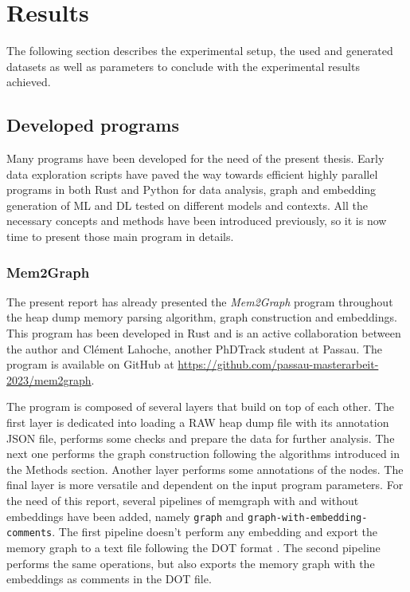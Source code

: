 \chapter{Results}\label{chap:results}

The following section describes the experimental setup, the used and generated datasets as well as parameters to conclude with the experimental results achieved.

\section{Developed programs}
Many programs have been developed for the need of the present thesis. Early data exploration scripts have paved the way towards efficient highly parallel programs in both Rust and Python for data analysis, graph and embedding generation of ML and DL tested on different models and contexts. All the necessary concepts and methods have been introduced previously, so it is now time to present those main program in details.

\subsection{Mem2Graph}
The present report has already presented the \textit{Mem2Graph} program throughout the heap dump memory parsing algorithm, graph construction and embeddings. This program has been developed in Rust and is an active collaboration between the author and Clément Lahoche, another PhDTrack student at Passau. The program is available on GitHub at \url{https://github.com/passau-masterarbeit-2023/mem2graph}. 

The program is composed of several layers that build on top of each other. The first layer is dedicated into loading a RAW heap dump file with its annotation JSON file, performs some checks and prepare the data for further analysis. The next one performs the graph construction following the algorithms introduced in the Methods section. Another layer performs some annotations of the nodes. The final layer is more versatile and dependent on the input program parameters. For the need of this report, several pipelines of memgraph with and without embeddings have been added, namely \texttt{graph} and \texttt{graph-with-embedding-comments}. The first pipeline doesn't perform any embedding and export the memory graph to a text file following the DOT format \cite{DotFormat15}. The second pipeline performs the same operations, but also exports the memory graph with the embeddings as comments in the DOT file. 

